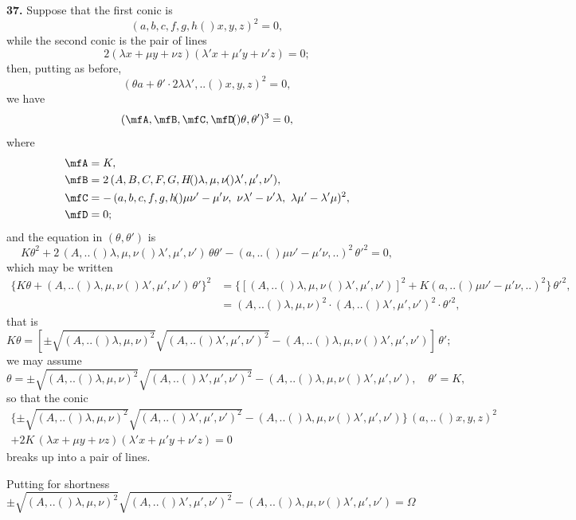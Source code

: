 \documentclass[11pt,a4paper]{book}
\providecommand{\qform}[1]{(#1)}
\begin{document}
\textbf{37.} Suppose that the first conic is
\[
(a, b, c, f, g, h \!\qform{}{x, y, z})^{2} = 0,
\]
while the second conic is the pair of lines
\[
2(\lambda x + \mu y + \nu z)(\lambda' x + \mu' y + \nu' z) = 0;
\]
then, putting as before,
\[
(\theta a + \theta' \cdot 2\lambda\lambda',.. \!\qform{}{x, y, z})^{2} = 0,
\]
we have
\[
(\mfA, \mfB, \mfC, \mfD \!\qform{}{\theta, \theta'})^{3} = 0,
\]
where
\begin{align*}
\mfA &= K,\\
\mfB &= 2\,(A, B, C, F, G, H \!\qform{}{\lambda, \mu, \nu}\!\qform{}{\lambda', \mu', \nu'}),\\
\mfC &= -\,(a, b, c, f, g, h \!\qform{}{\mu\nu' - \mu'\nu,\ \nu\lambda' - \nu'\lambda,\ \lambda\mu' - \lambda'\mu})^{2},\\
\mfD &= 0;
\end{align*}
and the equation in $(\theta, \theta')$ is
\[
K\theta^{2} + 2\,(A,..\!\qform{}{\lambda, \mu, \nu}\!\qform{}{\lambda', \mu', \nu'})\,\theta\theta'
- (a,..\!\qform{}{\mu\nu' - \mu'\nu,..})^{2}\,\theta'^{2} = 0,
\]
which may be written
\begin{align*}
\{K\theta + (A,..\!\qform{}{\lambda, \mu, \nu}\!\qform{}{\lambda', \mu', \nu'})\,\theta'\}^{2}
&= \{[(A,..\!\qform{}{\lambda, \mu, \nu}\!\qform{}{\lambda', \mu', \nu'})]^{2} + K(a,..\!\qform{}{\mu\nu' - \mu'\nu,..})^{2}\}\,\theta'^{2},\\
&= (A,..\!\qform{}{\lambda, \mu, \nu})^{2} \cdot (A,..\!\qform{}{\lambda', \mu', \nu'})^{2} \cdot \theta'^{2},
\end{align*}
that is
\[
K\theta = [\pm\sqrt{(A,..\!\qform{}{\lambda, \mu, \nu})^{2}}\sqrt{(A,..\!\qform{}{\lambda', \mu', \nu'})^{2}}
- (A,..\!\qform{}{\lambda, \mu, \nu}\!\qform{}{\lambda', \mu', \nu'})]\,\theta';
\]
we may assume
\[
\theta = \pm\sqrt{(A,..\!\qform{}{\lambda, \mu, \nu})^{2}}\sqrt{(A,..\!\qform{}{\lambda', \mu', \nu'})^{2}}
- (A,..\!\qform{}{\lambda, \mu, \nu}\!\qform{}{\lambda', \mu', \nu'}),\quad \theta' = K,
\]
so that the conic
\begin{multline*}
\{\pm\sqrt{(A,..\!\qform{}{\lambda, \mu, \nu})^{2}}\sqrt{(A,..\!\qform{}{\lambda', \mu', \nu'})^{2}}
- (A,..\!\qform{}{\lambda, \mu, \nu}\!\qform{}{\lambda', \mu', \nu'})\}\,(a,..\!\qform{}{x, y, z})^{2}\\
+ 2K\,(\lambda x + \mu y + \nu z)(\lambda' x + \mu' y + \nu' z) = 0
\end{multline*}
breaks up into a pair of lines.

Putting for shortness
\[
\pm\sqrt{(A,..\!\qform{}{\lambda, \mu, \nu})^{2}}\sqrt{(A,..\!\qform{}{\lambda', \mu', \nu'})^{2}}
- (A,..\!\qform{}{\lambda, \mu, \nu}\!\qform{}{\lambda', \mu', \nu'}) = \Omega
\]
\end{document}
